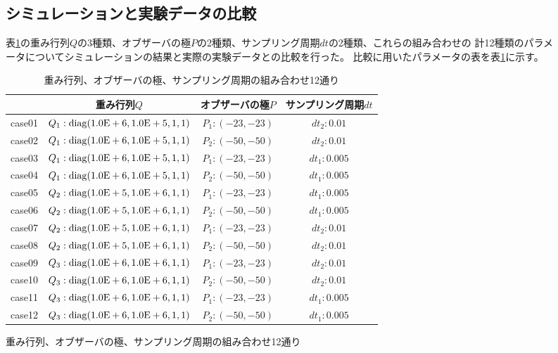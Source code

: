 \documentclass[a4j,11pt,twoside]{ujbook}
\begin{document}
\begin{figure}[htbp]
\begin{center}
		\subsection{シミュレーションと実験データの比較}
			表\ref{tb:QPTtable}の重み行列$Q$の3種類、オブザーバの極$P$の2種類、サンプリング周期$dt$の2種類、これらの組み合わせの
			計12種類のパラメータについてシミュレーションの結果と実際の実験データとの比較を行った。
			比較に用いたパラメータの表を表\ref{tb:QPTtable}に示す。\\
			\begin{table}[htbp]
				\begin{center}
					\caption{重み行列、オブザーバの極、サンプリング周期の組み合わせ12通り}
					\medskip
					\begin{tabular}{|c|c|c|c|} \hline
						& 重み行列$Q$ & オブザーバの極$P$ & サンプリング周期$dt$ \\ \hline\hline
						case01 &$Q_1:\rm{diag}(1.0E+6,1.0E+5,1,1)$ &$P_1:(-23,-23)$ & ${dt}_2:0.01$ \\\hline
						case02 &$Q_1:\rm{diag}(1.0E+6,1.0E+5,1,1)$ &$P_2:(-50,-50)$ & ${dt}_2:0.01$ \\\hline
						case03 &$Q_1:\rm{diag}(1.0E+6,1.0E+5,1,1)$ &$P_1:(-23,-23)$ & ${dt}_1:0.005$ \\\hline
						case04 &$Q_1:\rm{diag}(1.0E+6,1.0E+5,1,1)$ &$P_2:(-50,-50)$ & ${dt}_1:0.005$ \\\hline
						case05 &$Q_2:\rm{diag}(1.0E+5,1.0E+6,1,1)$ &$P_1:(-23,-23)$ & ${dt}_1:0.005$ \\\hline
						case06 &$Q_2:\rm{diag}(1.0E+5,1.0E+6,1,1)$ &$P_2:(-50,-50)$ & ${dt}_1:0.005$ \\\hline
						case07 &$Q_2:\rm{diag}(1.0E+5,1.0E+6,1,1)$ &$P_1:(-23,-23)$ & ${dt}_2:0.01$  \\\hline
						case08 &$Q_2:\rm{diag}(1.0E+5,1.0E+6,1,1)$ &$P_2:(-50,-50)$ & ${dt}_2:0.01$  \\\hline
						case09 &$Q_3:\rm{diag}(1.0E+6,1.0E+6,1,1)$ &$P_1:(-23,-23)$ & ${dt}_2:0.01$  \\\hline
						case10 &$Q_3:\rm{diag}(1.0E+6,1.0E+6,1,1)$ &$P_2:(-50,-50)$ & ${dt}_2:0.01$  \\\hline
						case11 &$Q_3:\rm{diag}(1.0E+6,1.0E+6,1,1)$ &$P_1:(-23,-23)$ & ${dt}_1:0.005$  \\\hline
						case12 &$Q_3:\rm{diag}(1.0E+6,1.0E+6,1,1)$ &$P_2:(-50,-50)$ & ${dt}_1:0.005$  \\\hline
					\end{tabular}
					\label{tb:QPTtable}
				\end{center}
			\end{table}
		

\end{center}
\end{figure}
\end{document}
